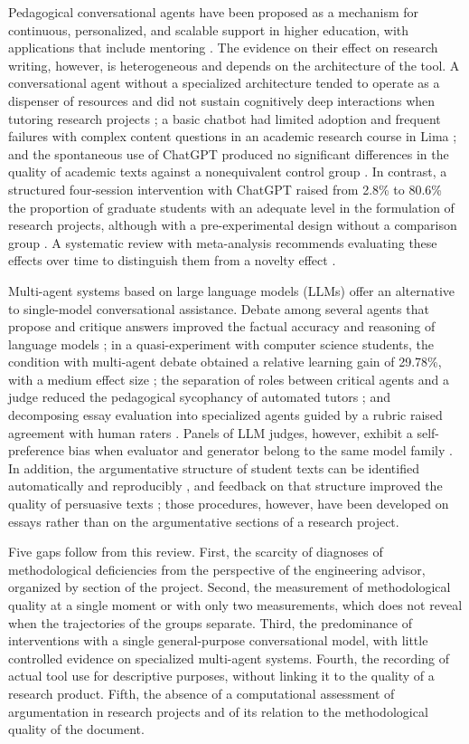\documentclass[journal]{IEEEtran}
\begin{document}
Pedagogical conversational agents have been proposed as a mechanism for continuous, personalized, and scalable support in higher education, with applications that include mentoring \cite{yusuf2025}. The evidence on their effect on research writing, however, is heterogeneous and depends on the architecture of the tool. A conversational agent without a specialized architecture tended to operate as a dispenser of resources and did not sustain cognitively deep interactions when tutoring research projects \cite{ortega2021}; a basic chatbot had limited adoption and frequent failures with complex content questions in an academic research course in Lima \cite{arredondo2020}; and the spontaneous use of ChatGPT produced no significant differences in the quality of academic texts against a nonequivalent control group \cite{apolin2024}. In contrast, a structured four-session intervention with ChatGPT raised from 2.8\% to 80.6\% the proportion of graduate students with an adequate level in the formulation of research projects, although with a pre-experimental design without a comparison group \cite{hinojosa2024}. A systematic review with meta-analysis recommends evaluating these effects over time to distinguish them from a novelty effect \cite{deng2025}.

Multi-agent systems based on large language models (LLMs) offer an alternative to single-model conversational assistance. Debate among several agents that propose and critique answers improved the factual accuracy and reasoning of language models \cite{duy2024}; in a quasi-experiment with computer science students, the condition with multi-agent debate obtained a relative learning gain of 29.78\%, with a medium effect size \cite{duj2025}; the separation of roles between critical agents and a judge reduced the pedagogical sycophancy of automated tutors \cite{sadhu2025}; and decomposing essay evaluation into specialized agents guided by a rubric raised agreement with human raters \cite{jordan2025}. Panels of LLM judges, however, exhibit a self-preference bias when evaluator and generator belong to the same model family \cite{panickssery2024}. In addition, the argumentative structure of student texts can be identified automatically and reproducibly \cite{stab2017}, and feedback on that structure improved the quality of persuasive texts \cite{wambsganss2020}; those procedures, however, have been developed on essays rather than on the argumentative sections of a research project.

Five gaps follow from this review. First, the scarcity of diagnoses of methodological deficiencies from the perspective of the engineering advisor, organized by section of the project. Second, the measurement of methodological quality at a single moment or with only two measurements, which does not reveal when the trajectories of the groups separate. Third, the predominance of interventions with a single general-purpose conversational model, with little controlled evidence on specialized multi-agent systems. Fourth, the recording of actual tool use for descriptive purposes, without linking it to the quality of a research product. Fifth, the absence of a computational assessment of argumentation in research projects and of its relation to the methodological quality of the document.
\end{document}
